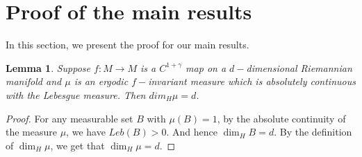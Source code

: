 \documentclass[11pt,a4paper]{amsart}
\theoremstyle{plain}
\newtheorem{Lem}[Thm]{Lemma}
\theoremstyle{remark}
\begin{document}
	\section{Proof of the main results}\label{proof}
	In this section, we present the proof for our main results. %
	\begin{Lem}\label{dim of measure}
		Suppose $f:M\rightarrow M$ is a $C^{1+\gamma}$ map on a $d-$dimensional Riemannian manifold and $\mu$ is an ergodic $f-$invariant measure which is absolutely continuous with the Lebesgue measure. Then $dim_{H} \mu=d$.
	\end{Lem}
	\begin{proof}
		For any measurable set $B$ with $\mu(B)=1$, by the absolute continuity of the measure $\mu$, we have $Leb(B)>0$. And hence $\dim_{H} B=d$. By the definition of $\dim_{H} \mu$, we get that $\dim_{H} \mu=d$.
	\end{proof}
\end{document}
